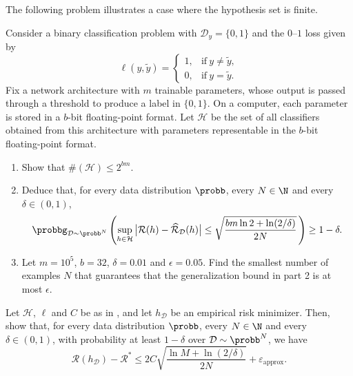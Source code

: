 The following problem illustrates a case where the hypothesis set is finite.
\begin{problem}\label{finite.precision.networks.prob}
Consider a binary classification problem with $\mathcal{D}_y=\{0,1\}$ and the $0$--$1$ loss given by
$$
\ell(y,\tilde{y}) = \left\{\begin{array}{ll}
1, & \text{if}~ y\ne \tilde{y},\\
0, & \text{if}~ y=\tilde{y}.
\end{array}\right.
$$
Fix a network architecture with $m$ trainable parameters, whose output is passed through a threshold to produce a label in $\{0,1\}$.  On a computer, each parameter is stored in a $b$-bit floating-point format.  Let $\mathcal{H}$ be the set of all classifiers obtained from this architecture with parameters representable in the $b$-bit floating-point format.
\begin{enumerate}
\item Show that $\#(\mathcal{H})\le 2^{bm}$.
\item Deduce that, for every data distribution $\probb$, every $N\in\N$ and every $\delta\in(0,1)$,
$$
\probbg_{\mathcal{D}\sim\probb^N}\left(\sup_{h\in\mathcal{H}}\big|\mathcal{R}(h)-\widehat{\mathcal{R}}_{\mathcal{D}}(h)\big| \le \sqrt{\frac{bm\ln 2 + \ln(2/\delta)}{2N}}\,\right) \ge 1-\delta.
$$
\item Let $m=10^5$, $b=32$, $\delta=0.01$ and $\epsilon=0.05$.  Find the smallest number of examples $N$ that guarantees that the generalization bound in part 2 is at most $\epsilon$.
\end{enumerate}
\end{problem}

\begin{problem}\label{finite.hypothesis.erm.cor}

Let $\mathcal{H}$, $\ell$ and $C$ be as in , and let $h_{\mathcal{D}}$ be an empirical risk minimizer.  Then, show that, for every data distribution $\probb$, every $N\in\N$ and every $\delta\in(0,1)$, with probability at least $1-\delta$ over $\mathcal{D}\sim\probb^N$, we have
$$
\mathcal{R}(h_{\mathcal{D}}) - \mathcal{R}^* \le 2C\sqrt{\frac{\ln M + \ln(2/\delta)}{2N}} + \varepsilon_\text{approx}.
$$
\end{problem}

